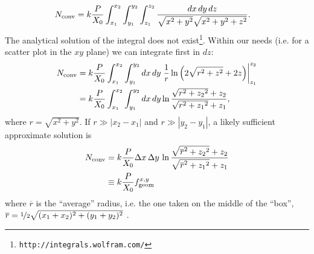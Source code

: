 \begin{description}
\begin{equation}
\begin{split}
N_{\rm conv} & = k
\frac{P}{X_0} \int_{x_1}^{x_2} \int_{y_1}^{y_2} \int_{z_1}^{z_2}  \frac{dx\,
  dy \, dz}{\sqrt{x^2+y^2}\sqrt{x^2+y^2+z^2}}. 
\end{split}
\label{eq:14}
\end{equation}
The analytical solution of the integral does not exist\footnote{\tt http://integrals.wolfram.com/}. Within
our needs (i.e. for a scatter plot in the $xy$ plane) we can integrate first in $dz$:
\begin{equation}
\begin{split}
N_{\rm conv} & = k
\frac{P}{X_0} \int_{x_1}^{x_2} \int_{y_1}^{y_2} dx \, dy \left. \frac{1}{r} \ln \left( 2\sqrt{r^2+z^2} + 2z \right) \right|_{z_1}^{z_2} \\
& = k \frac{P}{X_0} \int_{x_1}^{x_2} \int_{y_1}^{y_2} dx \, dy  \ln \frac{\sqrt{r^2+{z_2}^2} + z_2}{\sqrt{r^2+{z_1}^2} + z_1} ,
\end{split}
\label{eq:15}
\end{equation}
where $r=\sqrt{x^2+y^2}$. If $r\gg |x_2-x_1|$ and $r\gg |y_2
- y_1|$, a likely sufficient approximate
solution is
\begin{equation}
\begin{split}
N_{\rm conv} & = k
\frac{P}{X_0} \Delta x\, \Delta y\,  \ln \frac{\sqrt{\overline{r}^2+{z_2}^2} + z_2}{\sqrt{\overline{r}^2+{z_1}^2} + z_1} \\
& \equiv k \frac{P}{X_0} f^{x, y}_{\rm geom}
\end{split}
\label{eq:15}
\end{equation}
where $\overline{r}$ is the ``average'' radius, i.e. the one taken on
the middle of the ``box'', $\overline{r}=\nicefrac{1}{2}\sqrt{(x_1+x_2)^2+(y_1+y_2)^2}$
.
\end{description}

%










  